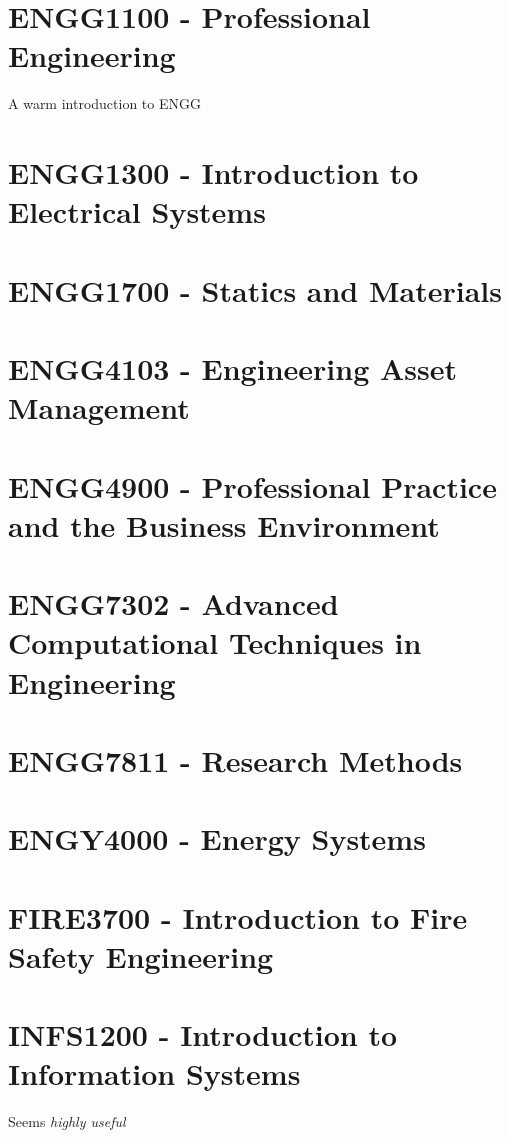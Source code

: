 \documentclass[a4paper,12pt]{report}
\begin{document}
\hypertarget{ENGG1100}{\section{ENGG1100 - Professional Engineering}}
A warm introduction to ENGG

\hypertarget{ENGG1300}{\section{ENGG1300 - Introduction to Electrical Systems}}

\hypertarget{ENGG1700}{\section{ENGG1700 - Statics and Materials}}

\hypertarget{ENGG4103}{\section{ENGG4103 - Engineering Asset Management}}

\hypertarget{ENGG4900}{\section{ENGG4900 - Professional Practice and the Business Environment}}

\hypertarget{ENGG7302}{\section{ENGG7302 - Advanced Computational Techniques in Engineering}}

\hypertarget{ENGG7811}{\section{ENGG7811 - Research Methods}}

\hypertarget{ENGY4000}{\section{ENGY4000 - Energy Systems}}

\hypertarget{FIRE3700}{\section{FIRE3700 - Introduction to Fire Safety Engineering}}

\hypertarget{INFS1200}{\section{INFS1200 - Introduction to Information Systems}}
Seems \textit{highly useful}
\end{document}
